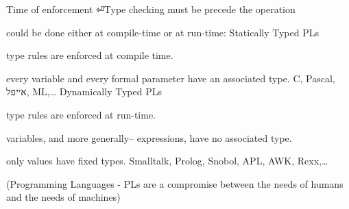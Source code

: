 \begin{טבלא}[!htbp]
      Time of enforcement
⏎Type checking must be precede the operation
              \item could be done either at compile-time or at run-time:
              Statically Typed PLs
              \item type rules are enforced at compile time.
              \item every variable and every formal parameter have
              an associated type.
              C, Pascal, אייפל, ML,…
              Dynamically Typed PLs
              \item type rules are enforced at run-time.
              \item variables, and more generally– expressions,
              have no associated type.
              \item only values have fixed types.
              Smalltalk, Prolog, Snobol, APL, AWK, Rexx,…

      (Programming Languages - PLs are a compromise
      between the needs of humans and the needs of machines)


\end{טבלא}
